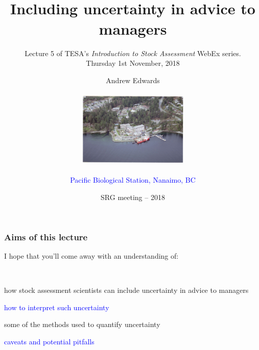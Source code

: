 

\title[Uncertainty]{~\\ Including uncertainty in advice to managers}
\author{Andrew Edwards\\ ~\\ \includegraphics[height=3.5cm]{images/pbs.png}\\  ~\\ \textcolor{blue}{Pacific Biological Station, Nanaimo, BC}}
\date{{\footnotesize SRG meeting -- 2018}}
\subtitle{\small Lecture 5 of TESA's \emph{Introduction to Stock Assessment} WebEx series.\\
Thursday 1st November, 2018}


\beamertemplatenavigationsymbolsempty   %

\frame[plain]{
\titlepage
}



\begin{frame}
\frametitle{Aims of this lecture}

I hope that you'll come away with an understanding of:

~\\

\begin{minipage}{12cm}
\bi
  \item how stock assessment scientists can include
    uncertainty in advice to managers
  \item \textcolor{blue}{how to interpret such uncertainty}
  \item some of the methods used to quantify uncertainty
  \item \textcolor{blue}{caveats and potential pitfalls}
\ei
\end{minipage}
\end{frame}



